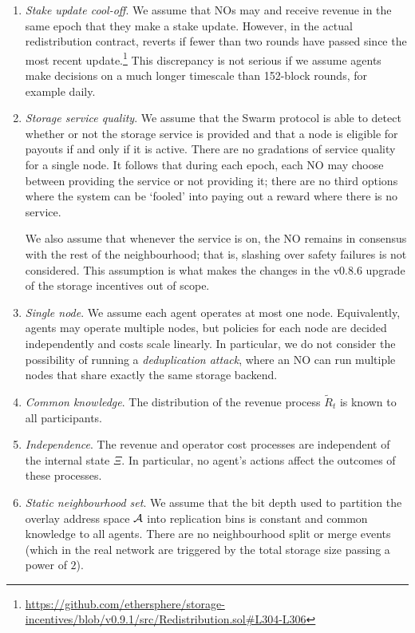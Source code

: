 \begin{enumerate}
  \item \emph{Stake update cool-off}. %
    We assume that NOs may  and receive revenue in the same epoch that they make a stake update.
    However, in the actual redistribution contract,  reverts if fewer than two rounds have passed since the most recent update.\footnote{\url{https://github.com/ethersphere/storage-incentives/blob/v0.9.1/src/Redistribution.sol\#L304-L306}}
    This discrepancy is not serious if we assume agents make decisions on a much longer timescale than 152-block rounds, for example daily.

  \item \emph{Storage service quality}. %
    We assume that the Swarm protocol is able to detect whether or not the storage service is provided and that a node is eligible for payouts if and only if it is active.
    There are no gradations of service quality for a single node.
    It follows that during each epoch, each NO may choose between providing the service or not providing it; there are no third options where the system can be `fooled' into paying out a reward where there is no service.
    
    We also assume that whenever the service is on, the NO remains in consensus with the rest of the neighbourhood; that is, slashing over safety failures is not considered.
    This assumption is what makes the changes in the v0.8.6 upgrade of the storage incentives out of scope.

  \item \emph{Single node}.
    We assume each agent operates at most one node.
    Equivalently, agents may operate multiple nodes, but policies for each node are decided independently and costs scale linearly.
    In particular, we do not consider the possibility of running a \emph{deduplication attack}, where an NO can run multiple nodes that share exactly the same storage backend.

  \item \emph{Common knowledge}.
    The distribution of the revenue process $\tilde{R}_t$ is known to all participants.

  \item \emph{Independence}.
    The revenue and operator cost processes are independent of the internal state $\Xi$.
    In particular, no agent's actions affect the outcomes of these processes.

  \item \emph{Static neighbourhood set}.
    We assume that the bit depth used to partition the overlay address space $\mathcal{A}$ into replication bins is constant and common knowledge to all agents.
    There are no neighbourhood split or merge events (which in the real network are triggered by the total storage size passing a power of $2$).



\end{enumerate}



